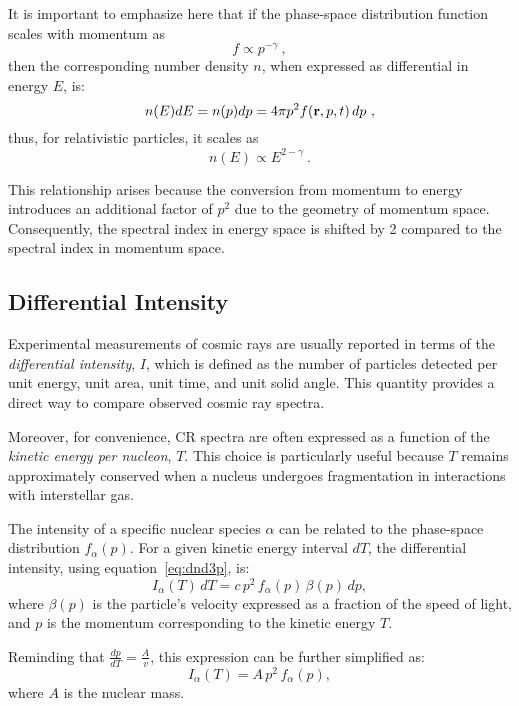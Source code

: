 It is important to emphasize here that if the phase-space distribution function scales with momentum as
\begin{equation}
f \propto p^{-\gamma}~,
\end{equation}
then the corresponding number density \( n\), when expressed as differential in energy \( E\), is:
\begin{equation}
n(E) dE = n(p) dp = 4 \pi p^2 f(\vb{r}, p, t) \, dp~,
\end{equation}
%
thus, for relativistic particles, it scales as
\begin{equation}
n(E) \propto E^{2-\gamma}~.
\end{equation}

This relationship arises because the conversion from momentum to energy introduces an additional factor of \(p^2\) due to the geometry of momentum space. Consequently, the spectral index in energy space is shifted by 2 compared to the spectral index in momentum space.  

\subsection{Differential Intensity}

Experimental measurements of cosmic rays are usually reported in terms of the \emph{differential intensity}, \(I\), which is defined as the number of particles detected per unit energy, unit area, unit time, and unit solid angle. This quantity provides a direct way to compare observed cosmic ray spectra.  

Moreover, for convenience, CR spectra are often expressed as a function of the \emph{kinetic energy per nucleon}, \(T\). This choice is particularly useful because \(T\) remains approximately conserved when a nucleus undergoes fragmentation in interactions with interstellar gas.  

The intensity of a specific nuclear species \(\alpha\) can be related to the phase-space distribution \(f_\alpha(p)\). 
%
For a given kinetic energy interval \(dT\), the differential intensity, using equation~\eqref{eq:dnd3p}, is:  
\begin{equation}
I_\alpha(T) \, dT = c \, p^2 \, f_\alpha(p) \, \beta(p) \, dp,
\end{equation}
where \(\beta(p) \) is the particle’s velocity expressed as a fraction of the speed of light, and \(p\) is the momentum corresponding to the kinetic energy \(T\).  

Reminding that \( \frac{dp}{dT} = \frac{A}{v} \), this expression can be further simplified as:  
\[
I_\alpha(T) = A \, p^2 \, f_\alpha(p),
\]  
where \(A\) is the nuclear mass.
